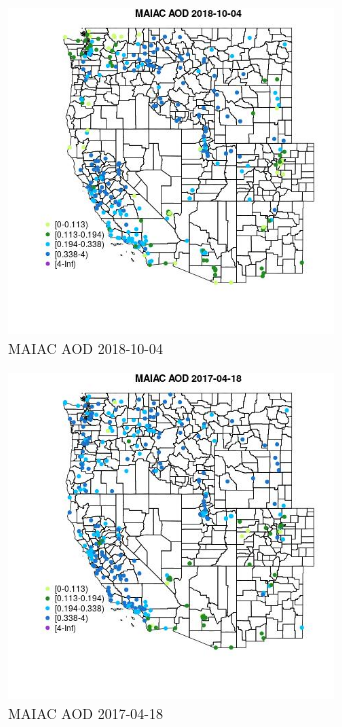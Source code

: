 \begin{figure} 
\centering  
\includegraphics[width=0.77\textwidth]{Code_Outputs/Report_ML_input_PM25_Step4_part_f_de_duplicated_aveswNAs_MapObsMAIAC_AOD2018-10-04.jpg} 
\caption{\label{fig:Report_ML_input_PM25_Step4_part_f_de_duplicated_aveswNAsMapObsMAIAC_AOD2018-10-04}MAIAC AOD 2018-10-04} 
\end{figure} 
 

\clearpage 

\begin{figure} 
\centering  
\includegraphics[width=0.77\textwidth]{Code_Outputs/Report_ML_input_PM25_Step4_part_f_de_duplicated_aveswNAs_MapObsMAIAC_AOD2017-04-18.jpg} 
\caption{\label{fig:Report_ML_input_PM25_Step4_part_f_de_duplicated_aveswNAsMapObsMAIAC_AOD2017-04-18}MAIAC AOD 2017-04-18} 
\end{figure} 
 

